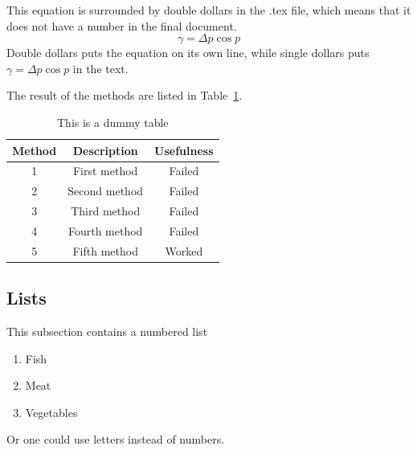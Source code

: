 \documentclass[twoside,fontsize=12pt,
     bibliography=totoc, %
     listof=totoc, %
     index=totoc, %
     onehalfspacing %
]{_MScDiss2017_cls}
\begin{document}
This equation is surrounded by double dollars in the .tex file, 
which means that it does not have a number in the final document. 
$$   
 \gamma = \Delta p \cos{ p }
$$
Double dollars puts the equation on its own line, while single 
dollars puts $\gamma = \Delta p \cos{ p }$ in the text. 

The result of the methods are listed in Table~\ref{tab:meth}. 
\begin{table}
 \begin{center}
 \begin{tabular}{|c|c|c|} \hline
 Method & Description & Usefulness \\ \hline
 1  &  First method  & Failed \\ \hline
 2  &  Second method & Failed \\ \hline
 3  &  Third method  & Failed \\ \hline
 4  &  Fourth method & Failed \\ \hline
 5  &  Fifth method  & Worked \\ \hline
 \end{tabular}
 \caption{This is a dummy table }
 \label{tab:meth}
 \end{center}
\end{table}

\subsection{Lists}
\label{subsec_list}
This subsection contains a numbered list
\begin{enumerate} 
 \item Fish
 \item Meat
 \item Vegetables
\end{enumerate}
Or one could use letters instead of numbers.

\begin{singlespace}%
    
\end{singlespace}
\end{document}
